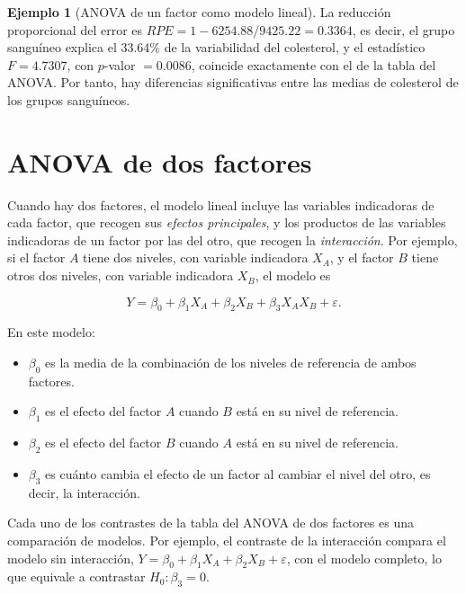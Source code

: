 \documentclass[
  spanish,
  a4paper,
]{scrreport}
\providecommand{\tightlist}{%
  \setlength{\itemsep}{0pt}\setlength{\parskip}{0pt}}
\theoremstyle{plain}
\theoremstyle{definition}
\newtheorem{example}{Ejemplo}[chapter]
\theoremstyle{definition}
\theoremstyle{remark}
\begin{document}
\begin{example}[ANOVA de un factor como modelo
lineal]
La reducción proporcional del error es
\(RPE = 1-6254.88/9425.22 = 0.3364\), es decir, el grupo sanguíneo
explica el 33.64\% de la variabilidad del colesterol, y el estadístico
\(F=4.7307\), con \(p\)-valor \(= 0.0086\), coincide exactamente con el
de la tabla del ANOVA. Por tanto, hay diferencias significativas entre
las medias de colesterol de los grupos sanguíneos.

\end{example}

\section{ANOVA de dos factores}\label{anova-de-dos-factores}

Cuando hay dos factores, el modelo lineal incluye las variables
indicadoras de cada factor, que recogen sus \emph{efectos principales},
y los productos de las variables indicadoras de un factor por las del
otro, que recogen la \emph{interacción}. Por ejemplo, si el factor \(A\)
tiene dos niveles, con variable indicadora \(X_A\), y el factor \(B\)
tiene otros dos niveles, con variable indicadora \(X_B\), el modelo es

\[
Y = \beta_0 + \beta_1 X_A + \beta_2 X_B + \beta_3 X_AX_B + \varepsilon.
\]

En este modelo:

\begin{itemize}
\tightlist
\item
  \(\beta_0\) es la media de la combinación de los niveles de referencia
  de ambos factores.
\item
  \(\beta_1\) es el efecto del factor \(A\) cuando \(B\) está en su
  nivel de referencia.
\item
  \(\beta_2\) es el efecto del factor \(B\) cuando \(A\) está en su
  nivel de referencia.
\item
  \(\beta_3\) es cuánto cambia el efecto de un factor al cambiar el
  nivel del otro, es decir, la interacción.
\end{itemize}

Cada uno de los contrastes de la tabla del ANOVA de dos factores es una
comparación de modelos. Por ejemplo, el contraste de la interacción
compara el modelo sin interacción,
\(Y = \beta_0 + \beta_1 X_A + \beta_2 X_B + \varepsilon\), con el modelo
completo, lo que equivale a contrastar \(H_0:\beta_3=0\).
\end{document}

